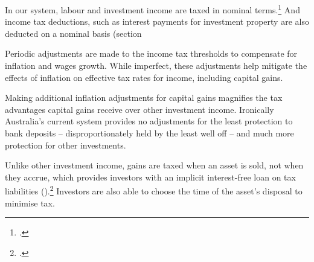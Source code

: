 \documentclass{grattan}\usepackage[]{graphicx}\usepackage[]{color}
\begin{document}
In our system, labour and investment income are taxed in nominal terms.\footcite{Treasury2010}  And income tax deductions, such as interest payments for investment property are also deducted on a nominal basis (section 

Periodic adjustments are made to the income tax thresholds to compensate for inflation and wages growth. While imperfect, these adjustments help mitigate the effects of inflation on effective tax rates for income, including capital gains.

Making additional inflation adjustments for capital gains magnifies the tax advantages capital gains receive over other investment income. Ironically Australia's current system provides no adjustments for the least protection to bank deposits -- disproportionately held by the least well off -- and much more protection for other investments.

Unlike other investment income, gains are taxed when an asset is sold, not when they accrue, which provides investors with an implicit interest-free loan on tax liabilities ().\footcites[See also:][p.~2]{Fane2004}[p.~12]{Ingles2009} Investors are also able to choose the time of the asset's disposal to minimise tax. 
\end{document}
